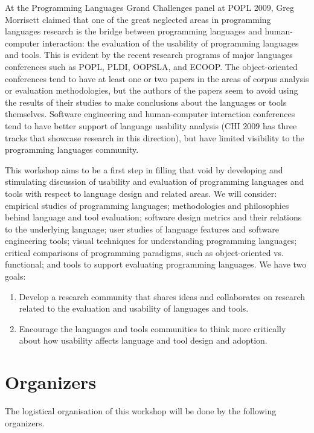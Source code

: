 \documentclass{sigplanconf}
\begin{document}
At the Programming Languages Grand Challenges panel at POPL 2009, Greg
Morrisett claimed that one of the great neglected areas in programming
languages research is the bridge between programming languages and
human-computer interaction: the evaluation of the usability of
programming languages and tools. This is evident by the recent
research programs of major languages conferences such as POPL, PLDI,
OOPSLA, and ECOOP. The object-oriented conferences tend to have at
least one or two papers in the areas of corpus analysis or evaluation
methodologies, but the authors of the papers seem to avoid using the
results of their studies to make conclusions about the languages or
tools themselves. Software engineering and human-computer interaction
conferences tend to have better support of language usability analysis
(CHI 2009 has three tracks that showcase research in this direction),
but have limited visibility to the programming languages community.

This workshop aims to be a first step in filling that void by
developing and stimulating discussion of usability and evaluation of
programming languages and tools with respect to language design and
related areas. We will consider: empirical studies of programming
languages; methodologies and philosophies behind language and tool
evaluation; software design metrics and their relations to the
underlying language; user studies of language features and software
engineering tools; visual techniques for understanding programming
languages; critical comparisons of programming paradigms, such as
object-oriented vs. functional; and tools to support evaluating
programming languages. We have two goals:

\begin{enumerate}
  \item 
Develop a research community that shares ideas and collaborates on 
research related to the evaluation and usability of languages and tools.
\item
Encourage the languages and tools communities to think more critically
about how usability affects language and tool design and
adoption.
\end{enumerate}


\section{Organizers}

The logistical organisation of this workshop will be done by the following organizers.
\end{document}
